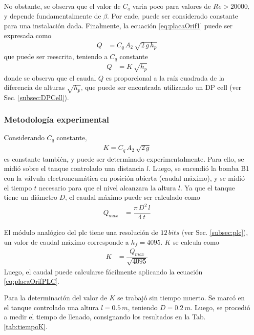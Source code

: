 No obstante, se observa que el valor de $C_q$ varia poco para valores de
$Re > 20000$, y depende fundamentalmente de $\beta$.
Por ende, puede ser considerado constante para una instalación dada.
Finalmente, la ecuación \eqref{eq:placaOrif1} puede ser expresada como
\begin{align}
 Q &= C_q\,A_2\, \sqrt{2\,g\,h_p}
\end{align}
que puede ser reescrita, teniendo a $C_q$ constante
\begin{align}
 Q &= K\,\sqrt{h_p}
 \label{eq:placaOrifPLC}
\end{align}
donde se observa que el caudal $Q$ es proporcional a la raíz cuadrada de
la diferencia de alturas $\sqrt{h_p}$, que puede
ser encontrada utilizando un DP cell (ver Sec. \ref{subsec:DPCell}).

\subsubsection{Metodología experimental}
Considerando $C_q$ constante,
\begin{align}
 K = C_q\, A_2\, \sqrt{2\,g}
\end{align}
es constante también, y puede ser determinado experimentalmente.
Para ello, se midió sobre el tanque controlado una distancia $l$.
Luego, se encendió la bomba B1 con la válvula electroneumática en posición
abierta (caudal máximo), y se midió el tiempo $t$ necesario para que el nivel
alcanzara la altura $l$.
Ya que el tanque tiene un diámetro $D$, el caudal máximo puede ser
calculado como
\begin{align}
 Q_{max} &= \dfrac{\pi\,D^2\,l}{4\,t}
\end{align}

El módulo analógico del \gls{plc} tiene una resolución de $12\,bits$
(ver Sec. \ref{subsec:plc}), un valor de caudal máximo corresponde a $h_f =
4095$.
$K$ se calcula como
\begin{align}
 K &= \dfrac{Q_{max}}{\sqrt{4095}}
\end{align}
Luego, el caudal puede calcularse fácilmente aplicando la ecuación
\eqref{eq:placaOrifPLC}.

Para la determinación del valor de $K$ se trabajó sin tiempo muerto.
Se marcó en el tanque controlado una altura $l=0.5\,m$, teniendo $D=0.2\,m$.
Luego, se procedió a medir el tiempo de llenado, consignando los resultados en
la Tab. \ref{tab:tiempoK}.

